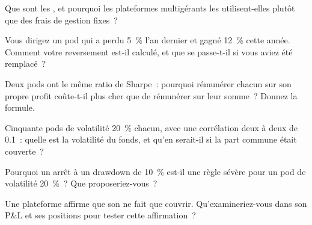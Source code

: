 \begin{interviewq}\label{iq:fm:the-multi-manager-platform:1}
Que sont les , et pourquoi les plateformes multigérants les utilisent-elles plutôt que des frais de gestion fixes~?
\end{interviewq}

\begin{interviewq}\label{iq:fm:the-multi-manager-platform:2}
Vous dirigez un pod qui a perdu 5~\% l'an dernier et gagné 12~\% cette année. Comment votre reversement est-il calculé, et que se passe-t-il si vous aviez été remplacé~?
\end{interviewq}

\begin{interviewq}\label{iq:fm:the-multi-manager-platform:3}
Deux pods ont le même ratio de Sharpe~: pourquoi rémunérer chacun sur son propre profit coûte-t-il plus cher que de rémunérer sur leur somme~? Donnez la formule.
\end{interviewq}

\begin{interviewq}\label{iq:fm:the-multi-manager-platform:4}
Cinquante pods de volatilité 20~\% chacun, avec une corrélation deux à deux de 0.1~: quelle est la volatilité du fonds, et qu'en serait-il si la part commune était couverte~?
\end{interviewq}

\begin{interviewq}\label{iq:fm:the-multi-manager-platform:5}
Pourquoi un arrêt à un drawdown de 10~\% est-il une règle sévère pour un pod de volatilité 20~\%~? Que proposeriez-vous~?
\end{interviewq}

\begin{interviewq}\label{iq:fm:the-multi-manager-platform:6}
Une plateforme affirme que son  ne fait que couvrir. Qu'examineriez-vous dans son P\&L et ses positions pour tester cette affirmation~?
\end{interviewq}

